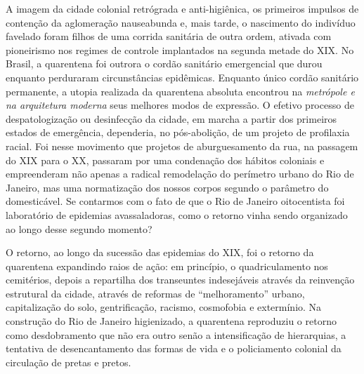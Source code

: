 A imagem da cidade colonial retrógrada e anti-higiênica, os primeiros
impulsos de contenção da aglomeração nauseabunda e, mais tarde, o
nascimento do indivíduo favelado foram filhos de uma corrida sanitária
de outra ordem, ativada com pioneirismo nos regimes de controle
implantados na segunda metade do XIX. No Brasil, a quarentena foi
outrora o cordão sanitário emergencial que durou enquanto perduraram
circunstâncias epidêmicas. Enquanto único cordão sanitário permanente, a
utopia realizada da quarentena absoluta encontrou na \emph{metrópole e
na arquitetura moderna} seus melhores modos de expressão. O efetivo
processo de despatologização ou desinfecção da cidade, em marcha a
partir dos primeiros estados de emergência, dependeria, no pós-abolição,
de um projeto de profilaxia racial. Foi nesse movimento que projetos de
aburguesamento da rua, na passagem do XIX para o XX, passaram por uma
condenação dos hábitos coloniais e empreenderam não apenas a radical
remodelação do perímetro urbano do Rio de Janeiro, mas uma normatização
dos nossos corpos segundo o parâmetro do domesticável. Se contarmos com
o fato de que o Rio de Janeiro oitocentista foi laboratório de epidemias
avassaladoras, como o retorno vinha sendo organizado ao longo desse
segundo momento?

O retorno, ao longo da sucessão das epidemias do XIX, foi o retorno da
quarentena expandindo raios de ação: em princípio, o quadriculamento nos
cemitérios, depois a repartilha dos transeuntes indesejáveis através da
reinvenção estrutural da cidade, através de reformas de ``melhoramento''
urbano, capitalização do solo, gentrificação, racismo, cosmofobia e
extermínio. Na construção do Rio de Janeiro higienizado, a quarentena
reproduziu o retorno como desdobramento que não era outro senão a
intensificação de hierarquias, a tentativa de desencantamento das formas
de vida e o policiamento colonial da circulação de pretas e pretos.

